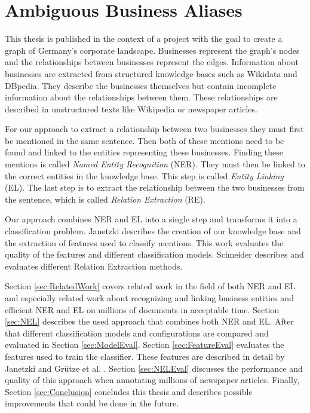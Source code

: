 \section{Ambiguous Business Aliases}
\label{sec:Introduction2}
This thesis is published in the context of a project with the goal to create a graph of Germany's corporate landscape. Businesses represent the graph's nodes and the relationships between businesses represent the edges. Information about businesses are extracted from structured knowledge bases such as Wikidata and DBpedia. They describe the businesses themselves but contain incomplete information about the relationships between them. These relationships are described in unstructured texts like Wikipedia or newspaper articles.\par
For our approach to extract a relationship between two businesses they must first be mentioned in the same sentence. Then both of these mentions need to be found and linked to the entities representing these businesses. Finding these mentions is called \textit{Named Entity Recognition} (NER). They must then be linked to the correct entities in the knowledge base. This step is called \textit{Entity Linking} (EL). The last step is to extract the relationship between the two businesses from the sentence, which is called \textit{Relation Extraction} (RE).\par
Our approach combines NER and EL into a single step and transforms it into a classification problem. Janetzki \cite{janetzki} describes the creation of our knowledge base and the extraction of features used to classify mentions. This work evaluates the quality of the features and different classification models. Schneider \cite{schneider} describes and evaluates different Relation Extraction methods.\par
Section \ref{sec:RelatedWork} covers related work in the field of both NER and EL and especially related work about recognizing and linking business entities and efficient NER and EL on millions of documents in acceptable time. Section \ref{sec:NEL} describes the used approach that combines both NER and EL. After that different classification models and configurations are compared and evaluated in Section \ref{sec:ModelEval}. Section \ref{sec:FeatureEval} evaluates the features used to train the classifier. These features are described in detail by Janetzki \cite{janetzki} and Grütze et al. \cite{coheel}. Section \ref{sec:NELEval} discusses the performance and quality of this approach when annotating millions of newspaper articles. Finally, Section \ref{sec:Conclusion} concludes this thesis and describes possible improvements that could be done in the future.

